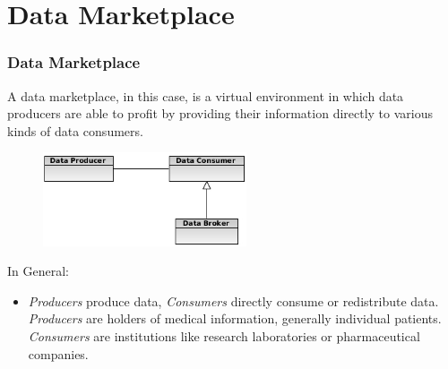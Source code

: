 \documentclass[t, 10pt]{beamer}
\begin{document}
\section{Data Marketplace}
\begin{frame}
\frametitle{Data Marketplace}
A data marketplace, in this case, is a virtual environment in which data producers are able to profit by providing their information directly to various kinds of data consumers.  

\begin{figure}
\includegraphics[width = 6cm]{roles}
\end{figure}
\pause

In General:
\begin{itemize}
\item \textit{Producers} produce data, \textit{Consumers} directly consume or redistribute data.  \textit{Producers} are holders of medical information, generally individual patients. \textit{Consumers} are institutions like research laboratories or pharmaceutical companies.
\end{itemize}

\end{frame}
\end{document}
